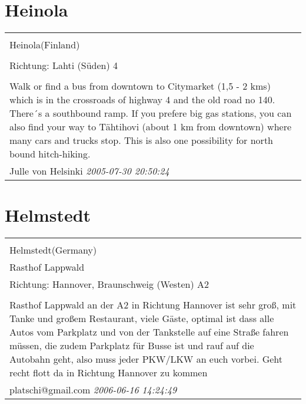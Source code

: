 \documentclass[a4paper,12pt]{article}
\begin{document}
\section{Heinola}
\begin{tabular}{|p{13cm}|}
\hline\\
Heinola(Finland)\\
\\
Richtung: Lahti (Süden) 4 \\
\hline\\
Walk or find a bus from downtown to Citymarket (1,5 - 2 kms) which is in the crossroads of highway 4 and the old road no 140. There´s a southbound ramp.
If you prefere big gas stations, you can also find your way to Tähtihovi (about 1 km from downtown) where many cars and trucks stop. This is also one possibility for north bound hitch-hiking. \\
Julle von Helsinki \textit{ 2005-07-30 20:50:24 }\\\hline
\end{tabular}


\section{Helmstedt}
\begin{tabular}{|p{13cm}|}
\hline\\
Helmstedt(Germany)\\
Rasthof Lappwald\\
Richtung: Hannover, Braunschweig (Westen) A2 \\
\hline\\
Rasthof Lappwald an der A2 in Richtung Hannover ist sehr groß, mit Tanke und großem Restaurant, viele Gäste, optimal ist dass alle Autos vom Parkplatz und von der Tankstelle auf eine Straße fahren müssen, die zudem Parkplatz für Busse ist und rauf auf die Autobahn geht, also muss jeder PKW/LKW an euch vorbei. Geht recht flott da in Richtung Hannover zu kommen \\
platschi@gmail.com \textit{ 2006-06-16 14:24:49 }\\\hline
\end{tabular}
\end{document}
